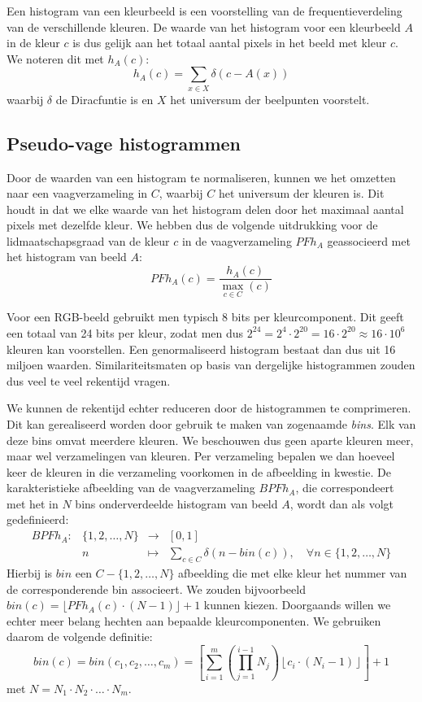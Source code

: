 Een histogram van een kleurbeeld is een voorstelling van de frequentieverdeling van de
verschillende kleuren. De waarde van het histogram voor een kleurbeeld $A$ in de kleur $c$ is
dus gelijk aan het totaal aantal pixels in het beeld met kleur $c$. We noteren dit met $h_A(c)$:
$$
h_A(c) = \sum_{x \in X} \delta (c - A(x))
$$
waarbij $\delta$ de Diracfuntie is en $X$ het universum der beelpunten voorstelt. 


\subsection{Pseudo-vage histogrammen}

Door de waarden van een histogram te normaliseren, kunnen we het omzetten naar een 
vaagverzameling in $C$, waarbij $C$ het universum der kleuren is. Dit houdt in dat we elke
waarde van het histogram delen door het maximaal aantal pixels met dezelfde kleur. 
We hebben dus de volgende uitdrukking voor de lidmaatschapsgraad van de kleur $c$ in de 
vaagverzameling $PFh_A$ geassocieerd met het histogram van beeld $A$:
$$
PFh_A(c) = \frac{\displaystyle h_A(c)}{\displaystyle \max_{c \in C}(c)}
$$

Voor een RGB-beeld gebruikt men typisch 8 bits per kleurcomponent. Dit geeft een totaal van
24 bits per kleur, zodat men dus $2^{24}=2^4 \cdot 2^{20}=16 \cdot 2^{20} \approx 16 \cdot 10^6$
kleuren kan voorstellen. Een genormaliseerd histogram bestaat dan dus uit 16 miljoen waarden.
Similariteitsmaten op basis van dergelijke histogrammen zouden dus veel te veel rekentijd vragen.

We kunnen de rekentijd echter reduceren door de histogrammen te comprimeren. Dit kan 
gerealiseerd worden door gebruik te 
maken van zogenaamde \emph{bins}. Elk van deze bins omvat meerdere kleuren. We beschouwen dus 
geen aparte kleuren meer, maar wel verzamelingen van kleuren. Per verzameling bepalen we dan 
hoeveel keer de kleuren in die verzameling voorkomen 
in de afbeelding in kwestie. De karakteristieke afbeelding van de vaagverzameling $BPFh_A$, die
correspondeert met het in $N$ bins onderverdeelde histogram van beeld $A$, wordt dan als volgt
gedefinieerd:  
$$
\begin{array}{lrcl}
BPFh_A: 	& \{1,2,\ldots,N\} 	& \to 		& [0,1] \\[5pt]
		& n						& \mapsto	& \displaystyle\sum_{c \in C} \delta (n -  bin(c)),
\quad\forall n \in \{1,2,\ldots,N\}
\end{array}
$$
Hierbij is $bin$ een $C - \{1,2,\ldots,N\}$ afbeelding die met elke kleur het nummer van de 
corresponderende bin associeert. We zouden bijvoorbeeld 
$bin(c) = \lfloor PFh_A(c) \cdot (N-1) \rfloor + 1$ kunnen kiezen. Doorgaands willen we echter
meer belang hechten aan bepaalde kleurcomponenten. We gebruiken daarom de volgende definitie:
$$
bin(c) = bin(c_1,c_2,\ldots,c_m) = \left[ \sum_{i=1}^m \left( \prod_{j=1}^{i-1} N_j \right) \left\lfloor c_i \cdot (N_i - 1) \right\rfloor \right] + 1
$$
met $N=N_1 \cdot N_2 \cdot \ldots \cdot N_m$.

